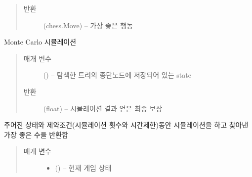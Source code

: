 \documentclass[letterpaper,10pt,english]{sphinxmanual}
\begin{document}
\begin{fulllineitems}
\begin{fulllineitems}
\begin{quote}
\begin{description}
\item[{반환}] \leavevmode
(chess.Move) -- 가장 좋은 행동

\end{description}\end{quote}

\end{fulllineitems}


\begin{fulllineitems}
\label{\detokenize{agents.search:agents.search.mcts_agent.MCTSPlanner.default_policy}}
Monte Carlo 시뮬레이션
\begin{quote}\begin{description}
\item[{매개 변수}] \leavevmode
{} ({\hyperref[\detokenize{scripts:scripts.run_game.State}]{}}) -- 탐색한 트리의 종단노드에 저장되어 있는 state

\item[{반환}] \leavevmode
(float) -- 시뮬레이션 결과 얻은 최종 보상

\end{description}\end{quote}

\end{fulllineitems}


\begin{fulllineitems}
\label{\detokenize{agents.search:agents.search.mcts_agent.MCTSPlanner.search}}
주어진 상태와 제약조건(시뮬레이션 횟수와 시간제한)동안 시뮬레이션을 하고
찾아낸 가장 좋은 수을 반환함
\begin{quote}\begin{description}
\item[{매개 변수}] \leavevmode\begin{itemize}
\item {} 
 ({\hyperref[\detokenize{scripts:scripts.run_game.State}]{}}) -- 현재 게임 상태


\end{itemize}
\end{description}
\end{quote}
\end{fulllineitems}
\end{fulllineitems}
\end{document}
